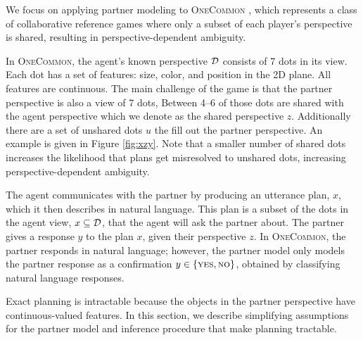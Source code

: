 \documentclass[11pt]{article}
\begin{document}
We focus on applying partner modeling to \textsc{OneCommon} \citep{onecommon}, which represents a class of collaborative reference games \citep{mf,pb} where only a subset of each player's perspective is shared, resulting in perspective-dependent ambiguity. 

In \textsc{OneCommon}, the agent's known perspective $\mathcal{D}$ consists
of 7 dots in its view.
Each dot has a set of features: size, color, and position in the 2D plane.
All features are continuous.
The main challenge of the game is that the partner perspective is also a view of 7 dots,
Between 4--6 of those dots are shared with the agent
perspective which we denote as the shared perspective $z$.
Additionally there are a set of unshared dots $u$ the fill out the partner perspective.
An example is given in Figure \ref{fig:xzy}.
Note that a smaller number of shared dots increases the likelihood that plans get misresolved to unshared dots, increasing perspective-dependent ambiguity.

The agent communicates with the partner by producing an utterance plan, $x$, which it then describes in natural language.
This plan is a subset of the dots in the agent view, $x \subseteq\mathcal{D}$,
that the agent will ask the partner about. The partner gives a response $y$ to the plan $x$, given their perspective $z$.
In \textsc{OneCommon}, the partner responds in natural language;
however, the partner model only models the partner response as a confirmation $y\in\left\{\textsc{yes}, \textsc{no}\right\}$,
obtained by classifying natural language responses.


Exact planning is intractable because the objects in the partner perspective have continuous-valued features.
In this section, we describe simplifying assumptions for the partner model and inference procedure that make planning tractable.
\end{document}
